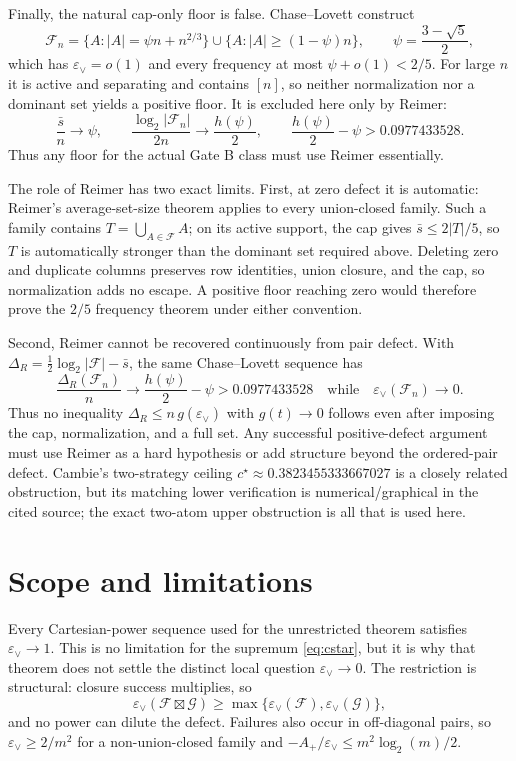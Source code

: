 \documentclass[11pt]{article}
\theoremstyle{remark}
\newcommand{\F}{\mathcal F}
\newcommand{\G}{\mathcal G}
\newcommand{\eps}{\varepsilon}
\begin{document}
Finally, the natural cap-only floor is false.  Chase--Lovett
\cite{ChaseLovett} construct
\[
 \F_n=\{A:|A|=\psi n+n^{2/3}\}
 \cup\{A:|A|\ge(1-\psi)n\},\qquad
 \psi=\frac{3-\sqrt5}{2},
\]
which has $\eps_\vee=o(1)$ and every frequency at most $\psi+o(1)<2/5$.
For large $n$ it is active and separating and contains $[n]$, so neither
normalization nor a dominant set yields a positive floor.  It is excluded here
only by Reimer:
\[
 \frac{\bar s}{n}\to\psi,\qquad
 \frac{\log_2|\F_n|}{2n}\to\frac{h(\psi)}2,\qquad
 \frac{h(\psi)}2-\psi>0.0977433528 .
\]
Thus any floor for the actual Gate B class must use Reimer essentially.

The role of Reimer has two exact limits.  First, at zero defect it is automatic:
Reimer's average-set-size theorem \cite{Reimer} applies to every union-closed
family.  Such a family contains \(T=\bigcup_{A\in\F}A\); on its active support,
the cap gives \(\bar s\le2|T|/5\), so \(T\) is automatically stronger than the
dominant set required above.  Deleting zero and duplicate columns preserves
row identities, union closure, and the cap, so normalization adds no escape.
A positive floor reaching zero would therefore prove the \(2/5\) frequency
theorem under either convention.

Second, Reimer cannot be recovered continuously from pair defect.  With
\(\Delta_R=\frac12\log_2|\F|-\bar s\), the same Chase--Lovett sequence has
\[
 \frac{\Delta_R(\F_n)}n\longrightarrow\frac{h(\psi)}2-\psi>0.0977433528
 \quad\text{while}\quad\eps_\vee(\F_n)\longrightarrow0.
\]
Thus no inequality
\(\Delta_R\le n\,g(\eps_\vee)\) with \(g(t)\to0\) follows even after imposing
the cap, normalization, and a full set.  Any successful positive-defect
argument must use Reimer as a hard hypothesis or add structure beyond the
ordered-pair defect.
Cambie's two-strategy ceiling $c^\star\approx0.3823455333667027$
\cite{Cambie} is a closely related obstruction, but its matching lower
verification is numerical/graphical in the cited source; the exact two-atom
upper obstruction is all that is used here.

\section{Scope and limitations}

Every Cartesian-power sequence used for the unrestricted theorem satisfies
\(\eps_\vee\to1\).  This is no limitation for the supremum
\eqref{eq:cstar}, but it is why that theorem does not settle the distinct local
question \(\eps_\vee\to0\).  The restriction is structural: closure success
multiplies, so
\[
 \eps_\vee(\F\boxtimes\G)
 \ge\max\{\eps_\vee(\F),\eps_\vee(\G)\},
\]
and no power can dilute the defect.  Failures also occur in off-diagonal pairs,
so \(\eps_\vee\ge2/m^2\) for a non-union-closed family and
\(-A_+/\eps_\vee\le m^2\log_2(m)/2\).
\end{document}
